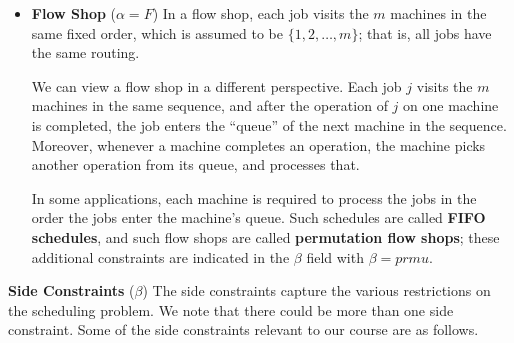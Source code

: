 \begin{itemize}
    \item {\bf Flow Shop} ($\alpha = F$) In a flow shop, each job visits the 
    $m$ machines in the same fixed order, which is assumed to be 
    $\{1, 2, \dots, m\}$; that is, all jobs have the same routing.
    
    We can view a flow shop in a different perspective. Each job $j$ 
    visits the $m$ machines in the same sequence, and after the operation of 
    $j$ on one machine is completed, the job enters the ``queue'' of the next 
    machine in the sequence. Moreover, whenever a machine completes an 
    operation, the machine picks another operation from its queue, and
    processes that. 

    In some applications, each machine is required to process the jobs in
    the order the jobs enter the machine's queue. Such schedules are called 
    {\bf FIFO schedules}, and such flow shops are called {\bf permutation
    flow shops}; these additional constraints are indicated in the 
    $\beta$ field with $\beta = prmu$. 

\end{itemize}

{\bf Side Constraints} ($\beta$) The side constraints capture the various 
restrictions on the scheduling problem. We note that there could be more than 
one side constraint. Some of the side constraints relevant to our course are 
as follows.

